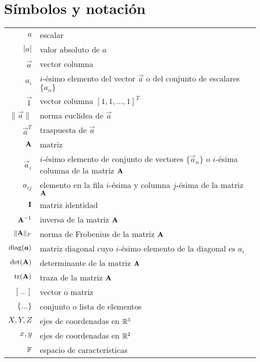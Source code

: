 \chapter*{Símbolos y notación}\label{notación}
\begin{longtable}{rp{}}
  $a$               & escalar \\
  $|a|$             & valor absoluto de $a$ \\
  $\vec{a}$         & vector columna \\
  $a_i$             & $i$-ésimo elemento del vector $\vec{a}$ o del conjunto
    de escalares $\{a_n\}$  \\
  $\vec{1}$         & vector columna $[1,1,\ldots,1]^T$ \\
  $\|\vec{a}\|$     & norma euclídea de $\vec{a}$  \\
  $\vec{a}^T$       & traspuesta de $\vec{a}$ \\
  $\mat{A}$         & matriz  \\
  $\vec{a}_i$       & $i$-ésimo elemento de conjunto de vectores $\{\vec{a}_n\}$
    o $i$-ésima columna de la matriz $\mat{A}$ \\
  $a_{ij}$          & elemento en la fila $i$-ésima y columna $j$-ésima de
    la matriz $\mat{A}$ \\
  $\mat{I}$         & matriz identidad \\
  $\mat{A}^{-1}$    & inversa de la matriz $\mat{A}$ \\
  $\|\mat{A}\|_F$   & norma de Frobenius de la matriz $\mat{A}$ \\
  $\operatorname*{diag}(\boldsymbol{a})$  & matriz diagonal cuyo $i$-ésimo elemento de la diagonal
    es $a_i$ \\
  $\det(\mat{A})$   & determinante de la matriz $\mat{A}$ \\
  $\trace(\mat{A})$ & traza de la matriz $\mat{A}$ \\
  $[\ldots]$        & vector o matriz \\
  $\{\ldots\}$      & conjunto o lista de elementos \\  
  $X, Y, Z$         & ejes de coordenadas en $\mathbb{R}^3$ \\
  $x, y$            & ejes de coordenadas en $\mathbb{R}^2$ \\
  $\mathbb{F}$         & espacio de características \\

\end{longtable}
